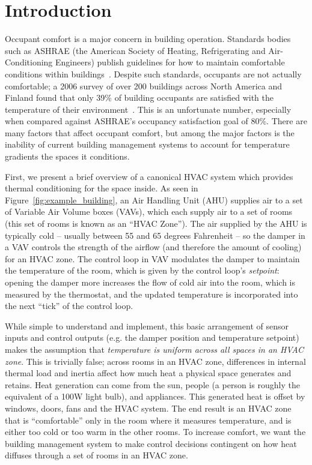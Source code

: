 \section{Introduction}


Occupant comfort is a major concern in building operation.
Standards bodies such as ASHRAE (the American Society of Heating, Refrigerating and Air-Conditioning Engineers) publish guidelines for how to maintain comfortable conditions within buildings~\cite{givoni1992comfort}.
Despite such standards, occupants are not actually comfortable; a 2006 survey of over 200 buildings across North America and Finland found that only 39\% of building occupants are satisfied with the temperature of their environment~\cite{huizenga2006air}.
This is an unfortunate number, especially when compared against ASHRAE's occupancy satisfaction goal of 80\%.
There are many factors that affect occupant comfort, but among the major factors is the inability of current building management systems to account for temperature gradients the spaces it conditions.

First, we present a brief overview of a canonical HVAC system which provides thermal conditioning for the space inside.
As seen in Figure~\ref{fig:example_building}, an Air Handling Unit (AHU) supplies air to a set of Variable Air Volume boxes (VAVs), which each supply air to a set of rooms (this set of rooms is known as an ``HVAC Zone'').
The air supplied by the AHU is typically cold -- usually between 55 and 65 degrees Fahrenheit -- so the damper in a VAV controls the strength of the airflow (and therefore the amount of cooling) for an HVAC zone.
The control loop in VAV modulates the damper to maintain the temperature of the room, which is given by the control loop's \emph{setpoint}: opening the damper more increases the flow of cold air into the room, which is measured by the thermostat, and the updated temperature is incorporated into the next ``tick'' of the control loop.

While simple to understand and implement, this basic arrangement of sensor inputs and control outputs (e.g. the damper position and temperature setpoint) makes the assumption that \emph{temperature is uniform across all spaces in an HVAC zone}.
This is trivially false; across rooms in an HVAC zone, differences in internal thermal load and inertia affect how much heat a physical space generates and retains.
Heat generation can come from the sun, people (a person is roughly the equivalent of a 100W light bulb), and appliances.
This generated heat is offset by windows, doors, fans and the HVAC system.
The end result is an HVAC zone that is ``comfortable'' only in the room where it measures temperature, and is either too cold or too warm in the other rooms.
To increase comfort, we want the building management system to make control decisions contingent on how heat diffuses through a set of rooms in an HVAC zone.

